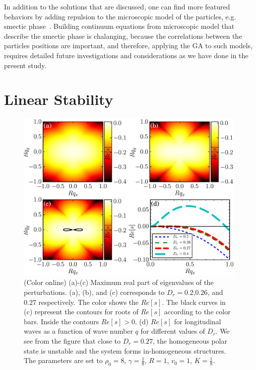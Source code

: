 \documentclass[reprint,floatfix,amsmath,amssymb,aps,pre,showkeys,showpacs,superscriptaddress]{revtex4-1}
\begin{document}
In addition to the solutions that are discussed, one can find more featured behaviors by adding repulsion to the microscopic model of the particles, e.g. smectic phase~\cite{Menzel2013unidirectional,Romanczuk2016emergent,Menzel2016on,Chen2013universality,Adhyapak2013live}. Building continuum equations from microscopic model that describe the smectic phase is chalanging, because the correlations between the particles positions are important, and therefore, applying the GA to such models, requires detailed future investigations and considerations as we have done in the present study.

\section{Linear Stability}
\label{section:linear-stability}

\begin{figure}
	\centering
	\includegraphics[width=\columnwidth]{Fig7_linear-stability}
\caption{(Color online) (a)-(c) Maximum real part of eigenvalues of the perturbations. (a), (b), and (c) corresponds to $D_r=0.2$,$0.26$, and $0.27$ respectively. The color shows the $Re[s]$. The black curves in (c) represent the contours for roots of $Re[s]$ according to the color bars. Inside the contours $Re[s] > 0$. (d) $Re[s]$ for longitudinal waves as a function of wave number $q$ for different values of $D_r$. We see from the figure that close to $D_r=0.27$, the homogeneous polar state is unstable and the system forms in-homogeneous structures. The parameters are set to $\rho_0=8$, $\gamma=\tfrac{1}{8}$, $R=1$, $v_0=1$, $K=\tfrac{1}{8}$.}
\label{fig:s-map}
\end{figure}
\end{document}
